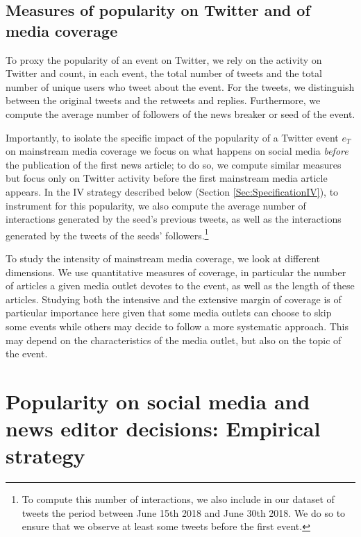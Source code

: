 \subsection{Measures of popularity on Twitter and of media coverage}

To proxy the popularity of an event on Twitter, we rely on the activity on Twitter and count, in each event, the total number of tweets and the total number of unique users who tweet about the event. For the tweets, we distinguish between the original tweets and the retweets and replies. Furthermore, we compute the average number of followers of the news breaker or seed of the event.

Importantly, to isolate the specific impact of the popularity of a Twitter event $e_T$ on mainstream media coverage we focus on what happens on social media \textit{before} the publication of the first news article; to do so, we compute similar measures but focus only on Twitter activity before the first mainstream media article appears. In the IV strategy described below (Section \ref{Sec:SpecificationIV}), to instrument for this popularity, we also compute the average number of interactions generated by the seed's previous tweets, as well as the interactions generated by the tweets of the seeds' followers.\footnote{To compute this number of interactions, we also include in our dataset of tweets the period between June 15th 2018 and June 30th 2018. We do so to ensure that we observe at least some tweets before the first event.} 


To study the intensity of mainstream media coverage, we look at different dimensions. We use quantitative measures of coverage, in particular the number of articles a given media outlet devotes to the event, as well as the length of these articles. Studying both the intensive and the extensive margin of coverage is of particular importance here given that some media outlets can choose to skip some events while others may decide to follow a more systematic approach. This may depend on the characteristics of the media outlet, but also on the topic of the event.


\section{Popularity on social media and news editor decisions: Empirical strategy\label{Sec:EmpiricalSpecification}}

